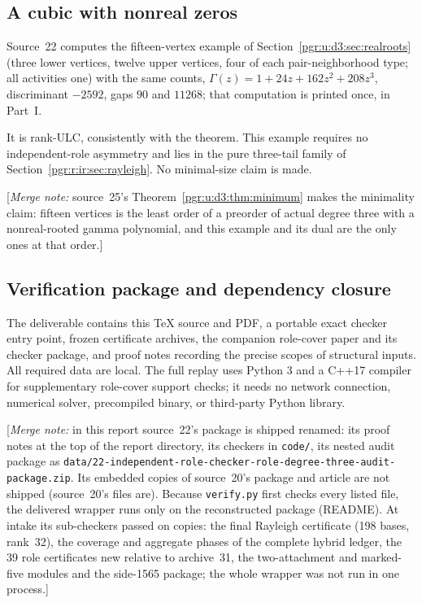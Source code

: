 \documentclass[11pt]{article}
\numberwithin{equation}{section}
\theoremstyle{definition}\newtheorem{definition}[theorem]{Definition}\newtheorem{remark}[theorem]{Remark}
\newcommand{\Ga}{\Gamma}                   %
\newcommand{\mnote}[1]{[\textit{Merge note:} #1]}
\begin{document}
\subsection{A cubic with nonreal zeros}\label{pgr:r:ir:sec:nonreal}

Source~22 computes the fifteen-vertex example of
Section~\ref{pgr:u:d3:sec:realroots} (three lower vertices, twelve upper
vertices, four of each pair-neighborhood type; all activities one) with
the same counts, $\Ga(z)=1+24z+162z^2+208z^3$, discriminant $-2592$, gaps
$90$ and $11268$; that computation is printed once, in Part~I.

It is rank-ULC, consistently with the theorem. This example requires no independent-role asymmetry and lies in the pure three-tail family of Section~\ref{pgr:r:ir:sec:rayleigh}. No minimal-size claim is made.

\mnote{source~25's Theorem~\ref{pgr:u:d3:thm:minimum} makes the minimality
claim: fifteen vertices is the least order of a preorder of actual degree
three with a nonreal-rooted gamma polynomial, and this example and its
dual are the only ones at that order.}


\subsection[Verification and dependencies]{Verification package and dependency closure}\label{pgr:r:ir:sec:replay}
The deliverable contains this TeX source and PDF, a portable exact checker entry point, frozen certificate archives, the companion role-cover paper and its checker package, and proof notes recording the precise scopes of structural inputs. All required data are local. The full replay uses Python 3 and a C++17 compiler for supplementary role-cover support checks; it needs no network connection, numerical solver, precompiled binary, or third-party Python library.


\mnote{in this report source~22's package is shipped renamed: its proof
notes at the top of the report directory, its checkers in \texttt{code/},
its nested audit package as
\texttt{data/22-independent-role-checker-role-degree-three-audit-package.zip}.
Its embedded copies of source~20's package and article are not shipped
(source~20's files are). Because \texttt{verify.py} first checks every
listed file, the delivered wrapper runs only on the reconstructed package
(README). At intake its sub-checkers passed on copies: the final Rayleigh
certificate (198 bases, rank~32), the coverage and aggregate phases of the
complete hybrid ledger, the 39 role certificates new relative to
archive~31, the two-attachment and marked-five modules and the side-1565
package; the whole wrapper was not run in one process.}
\end{document}
